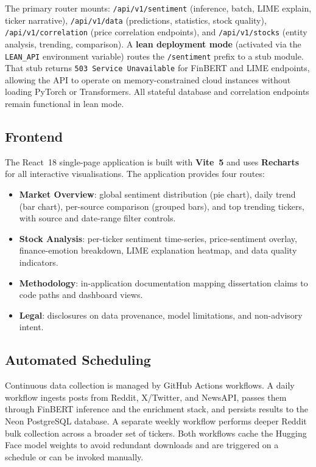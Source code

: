 The primary router mounts: \texttt{/api/v1/sentiment} (inference, batch, LIME explain, ticker narrative), \texttt{/api/v1/data} (predictions, statistics, stock quality), \texttt{/api/v1/correlation} (price correlation endpoints), and \texttt{/api/v1/stocks} (entity analysis, trending, comparison).  A \textbf{lean deployment mode} (activated via the \texttt{LEAN\_API} environment variable) routes the \texttt{/sentiment} prefix to a stub module. That stub returns \texttt{503 Service Unavailable} for FinBERT and LIME endpoints, allowing the API to operate on memory-constrained cloud instances without loading PyTorch or Transformers.  All stateful database and correlation endpoints remain functional in lean mode.

\subsection{Frontend}

The React~18 single-page application is built with \textbf{Vite~5} and uses \textbf{Recharts} for all interactive visualisations.  The application provides four routes:
\begin{itemize}
    \item \textbf{Market Overview}: global sentiment distribution (pie chart), daily trend (bar chart), per-source comparison (grouped bars), and top trending tickers, with source and date-range filter controls.
    \item \textbf{Stock Analysis}: per-ticker sentiment time-series, price-sentiment overlay, finance-emotion breakdown, LIME explanation heatmap, and data quality indicators.
    \item \textbf{Methodology}: in-application documentation mapping dissertation claims to code paths and dashboard views.
    \item \textbf{Legal}: disclosures on data provenance, model limitations, and non-advisory intent.
\end{itemize}

\subsection{Automated Scheduling}

Continuous data collection is managed by GitHub Actions workflows.  A daily workflow ingests posts from Reddit, X/Twitter, and NewsAPI, passes them through FinBERT inference and the enrichment stack, and persists results to the Neon PostgreSQL database.  A separate weekly workflow performs deeper Reddit bulk collection across a broader set of tickers.  Both workflows cache the Hugging Face model weights to avoid redundant downloads and are triggered on a schedule or can be invoked manually.
